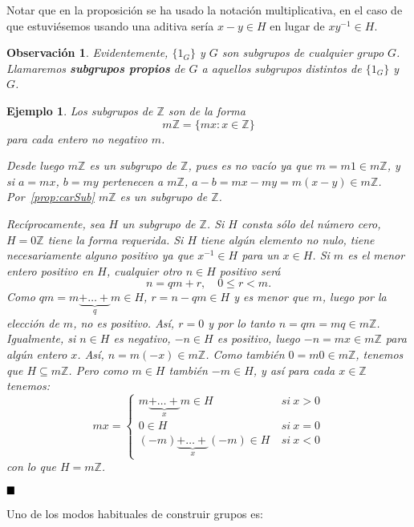 \documentclass[12pt]{article}
\newtheorem{example}{Ejemplo}[theorem]
\newtheorem{observation}{Observación}[theorem]
\begin{document}
Notar que en la proposición se ha usado la notación multiplicativa, en el caso de que estuviésemos usando una aditiva sería $x-y \in H$ en lugar de $xy^{-1} \in H$.

\begin{observation}Evidentemente, $\lbrace 1_G \rbrace$ y $G$ son subgrupos de cualquier grupo $G$. Llamaremos \textbf{subgrupos propios} de $G$ a aquellos subgrupos distintos de $\lbrace 1_G \rbrace$ y $G$.
\end{observation}

\begin{example}
Los subgrupos de $\mathbb{Z}$ son de la forma $$m\mathbb{Z} = \lbrace mx:x \in \mathbb{Z} \rbrace$$ para cada entero no negativo $m$. 

Desde luego $m\mathbb{Z}$ es un subgrupo de $\mathbb{Z}$, pues es no vacío ya que $m = m1 \in m\mathbb{Z}$, y si $a = mx$, $b = my$ pertenecen a $m\mathbb{Z}$, $a-b = mx-my=m(x-y) \in m\mathbb{Z}$. Por~\ref{prop:carSub} $m\mathbb{Z}$ es un subgrupo de $\mathbb{Z}$.

Recíprocamente, sea $H$ un subgrupo de $\mathbb{Z}$. Si $H$ consta sólo del número cero, $H = 0 \mathbb{Z}$ tiene la forma requerida. Si $H$ tiene algún elemento no nulo, tiene necesariamente alguno positivo ya que $x^{-1} \in H$ para un $x \in H$. Si $m$ es el menor entero positivo en $H$, cualquier otro $n \in H$ positivo será $$n = qm+r, \quad 0 \leq r < m.$$ Como $qm = m\underbrace{+ \ldots + }_q m \in H$, $r = n-qm \in H$ y es menor que $m$, luego por la elección de $m$, no es positivo. Así, $r = 0$ y por lo tanto $n = qm = mq \in m\mathbb{Z}$. Igualmente, si $n \in H$ es negativo, $-n \in H$ es positivo, luego $-n = mx \in m \mathbb{Z}$ para algún entero $x$. Así, $n = m(-x) \in m \mathbb{Z}$. Como también $0 = m0 \in m \mathbb{Z}$, tenemos que $H \subseteq m\mathbb{Z}$. Pero como $m \in H$ también $-m \in H$, y así para cada $x \in \mathbb{Z}$ tenemos: 
$$
mx = \left\{
    \begin{array}{ll}
        m \underbrace{+ \ldots +}_x m \in H &~si~ x>0 \\
        0 \in H &~si~ x=0 \\
        (-m) \underbrace{+ \ldots +}_x (-m) \in H&~si~ x<0
    \end{array}
\right.
$$
con lo que $H = m\mathbb{Z}$.
\end{example}

$\hfill \blacksquare$

Uno de los modos habituales de construir grupos es: 
\end{document}
